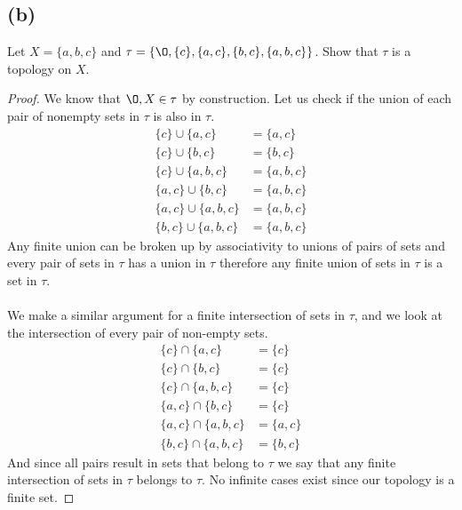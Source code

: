 \documentclass{article}
\begin{document}
\subsection*{(b)}
Let $X = \{a,b,c\}$ and $\tau = \{\O, \{c\}, \{a,c\}, \{b,c\}, \{a,b,c\}\}$.
Show that $\tau$ is a topology on $X$.
\begin{proof}
    We know that $\O, X \in \tau$ by construction.
    Let us check if the union of each pair of nonempty sets in $\tau$ is also in $\tau$.
    \begin{align*}
        \{c\}\cup \{a,c\} & = \{a,c\} \\
        \{c\} \cup \{b,c\} & = \{b,c\} \\
        \{c\} \cup \{a,b,c\} & = \{a,b,c\} \\
        \{a,c\} \cup \{b,c\} & = \{a,b,c\} \\
        \{a,c\} \cup \{a,b,c\} & = \{a,b,c\} \\
        \{b,c\} \cup \{a,b,c\} & = \{a,b,c\}      
    \end{align*}
    Any finite union can be broken up by associativity to unions of pairs of sets and every pair of sets in $\tau$ has a union in $\tau$ therefore any finite union of sets in $\tau$ is a set in $\tau$.
    \\\\
    We make a similar argument for a finite intersection of sets in $\tau$, and we look at the intersection of every pair of non-empty sets.
    \begin{align*}
        \{c\}\cap \{a,c\} & = \{c\} \\
        \{c\} \cap \{b,c\} & = \{c\} \\
        \{c\} \cap \{a,b,c\} & = \{c\} \\
        \{a,c\} \cap \{b,c\} & = \{c\} \\
        \{a,c\} \cap \{a,b,c\} & = \{a,c\} \\
        \{b,c\} \cap \{a,b,c\} & = \{b,c\}
    \end{align*}
    And since all pairs result in sets that belong to $\tau$ we say that any finite intersection of sets in $\tau$ belongs to $\tau$.
    No infinite cases exist since our topology is a finite set.
\end{proof}
\end{document}
